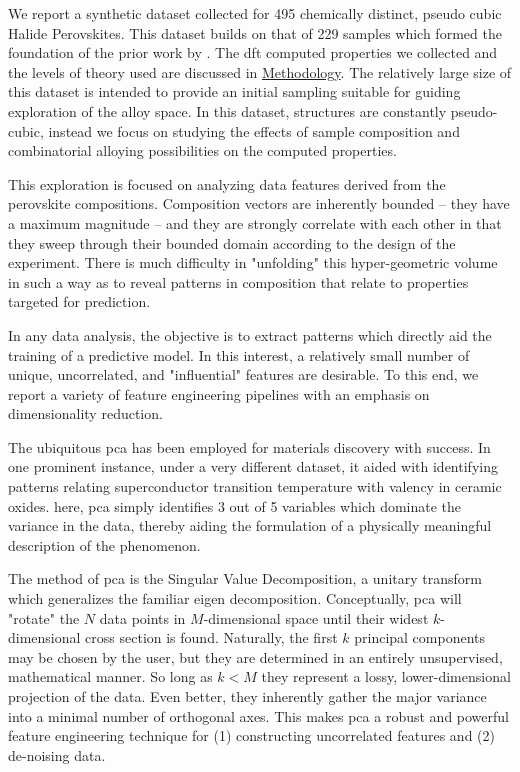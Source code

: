 \documentclass[twoside, twocolumn, 9pt, draft]{article}
\begin{document}
We report a synthetic dataset collected for 495 chemically distinct,
pseudo cubic Halide Perovskites. This dataset builds on that of 229
samples which formed the foundation of the prior work by
\citet{mannodi-kanakkithodi-2022-data-driven}. The \acrfull{dft} computed properties we collected and the levels of theory
used are discussed in \hyperref[sec:org8caf7fd]{Methodology}. The relatively large size of this
dataset is intended to provide an initial sampling suitable for
guiding exploration of the alloy space. In this dataset, structures
are constantly pseudo-cubic, instead we focus on studying the effects
of sample composition and combinatorial alloying possibilities on the
computed properties.

This exploration is focused on analyzing data features derived from
the perovskite compositions. Composition vectors are inherently
bounded -- they have a maximum magnitude -- and they are strongly
correlate with each other in that they sweep through their bounded
domain according to the design of the experiment. There is much
difficulty in "unfolding" this hyper-geometric volume in such a way as
to reveal patterns in composition that relate to properties targeted
for prediction. 

In any data analysis, the objective is to extract patterns which
directly aid the training of a predictive model. In this interest, a
relatively small number of unique, uncorrelated, and
"influential"\cite{mahoney-2009-cur-matrix} features are desirable. To
this end, we report a variety of feature engineering pipelines with an
emphasis on dimensionality reduction.

The ubiquitous \acrfull{pca} has been employed
for materials discovery with success. In one prominent instance, under
a very different dataset, it aided with identifying patterns relating
superconductor transition temperature with valency in ceramic
oxides\cite{rajan-2009-princ-compon}. here, pca simply identifies 3 out
of 5 variables which dominate the variance in the data, thereby aiding
the formulation of a physically meaningful description of the
phenomenon.

The method of \acrshort{pca} is the Singular Value Decomposition, a unitary
transform which generalizes the familiar eigen decomposition.
Conceptually, \acrshort{pca} will "rotate" the \(N\) data points in
\(M\)-dimensional space until their widest \(k\)-dimensional cross
section is found. Naturally, the first \(k\) principal components may
be chosen by the user, but they are determined in an entirely
unsupervised, mathematical manner. So long as \(k<M\) they represent a
lossy, lower-dimensional projection of the data. Even better, they
inherently gather the major variance into a minimal number of
orthogonal axes. This makes \acrshort{pca} a robust and powerful feature
engineering technique for (1) constructing uncorrelated
features\cite{mahoney-2009-cur-matrix} and (2) de-noising data.
\end{document}
